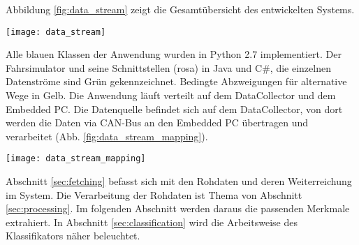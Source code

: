 \label{chap:implementation}

Abbildung \ref{fig:data_stream} zeigt die Gesamtübersicht des entwickelten Systems. 
\begin{figure*} 
  \begin{center}
    \texttt{[image: data\_stream]}
    \caption[Aufbau der Anwendung]{Der Aufbau des entwickelten System zur Müdigkeitserkennung. Grün: Datenströme, Blau: Python Klassen der Anwendung, Gelb: bedingte Abzweigungen, Rosa: Klassen der Fahrsimulatorumgebung\label{fig:data_stream}}
  \end{center}
\end{figure*}
Alle blauen Klassen der Anwendung wurden in Python 2.7 implementiert. Der Fahrsimulator und seine Schnittstellen (rosa) in Java und C\#, die einzelnen Datenströme sind Grün gekennzeichnet. Bedingte Abzweigungen für alternative Wege in Gelb. Die Anwendung läuft verteilt auf dem DataCollector und dem Embedded PC. Die Datenquelle befindet sich auf dem DataCollector, von dort werden die Daten via CAN-Bus an den Embedded PC übertragen und verarbeitet (Abb. \ref{fig:data_stream_mapping}). 
\begin{figure*} 
  \begin{center}
    \texttt{[image: data\_stream\_mapping]}
    \caption[Einbettung der Anwendung]{Datenquelle und Verarbeitung sind verteilt im Fahrsimulator eingebettet. Die Übertrageung erfolgt via CAN-Bus. \label{fig:data_stream_mapping}}
  \end{center}
\end{figure*}

\threadingSequence

Abschnitt \ref{sec:fetching} befasst sich mit den Rohdaten und deren Weiterreichung im System. Die Verarbeitung der Rohdaten ist Thema von Abschnitt \ref{sec:processing}. Im folgenden Abschnitt werden daraus die passenden Merkmale extrahiert. In Abschnitt \ref{sec:classification} wird die Arbeitsweise des Klassifikators näher beleuchtet. 



